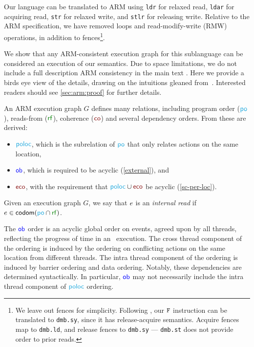 Our language can be translated to ARM using \texttt{ldr} for relaxed read,
\texttt{ldar} for acquiring read, \texttt{str} for relaxed write, and
\texttt{stlr} for releasing write.  Relative to the ARM specification, we
have removed loops and read-modify-write (RMW) operations, in addition to
fences\footnote{We leave out fences for simplicity.  Following
  \citet{DBLP:journals/pacmpl/PodkopaevLV19}, our $\mathtt{F}$ instruction can be
  translated to \texttt{dmb.sy}, since it has release-acquire semantics.
  Acquire fences map to \texttt{dmb.ld}, and release fences to
  \texttt{dmb.sy} --- \texttt{dmb.st} does not provide order to prior
  reads.}.

We show that any ARM-consistent execution graph for this sublanguage can be
considered an execution of our semantics.  
% 
% 
Due to space limitations, we do not include a full description ARM
consistency in the main text .
Here we provide a birds eye view of the details, drawing on the intuitions gleaned from~\citep{DBLP:journals/pacmpl/PulteFDFSS18}.  
Interested readers should see \textsection\ref{sec:arm:proof}
for further details.

An ARM execution graph $G$ defines many relations, including program order
($\rpox$), reads-from ($\rrfx$), coherence ($\rco$) and several dependency
orders.  From these are derived:
\begin{itemize}
\item ${\rpoloc}$, which is the subrelation of $\rpox$ that only relates
  actions on the same location,
\item ${\mathrel{\textcolor{blue}{\mathsf{ob}}}}$, which is required to be acyclic (\ref{external}), and
\item $\reco$, with the requirement that ${\rpoloc}\cup{\reco}$ be acyclic (\ref{sc-per-loc}).
\end{itemize}
Given an execution graph $G$, we say that $e$ is an \emph{internal read} if $\aEv\in\fcodom({\rpox}\cap {\rrfx})$.

The ${\mathrel{\textcolor{blue}{\mathsf{ob}}}}$ order is an acyclic global order on events, agreed upon by all threads, reflecting the progress of time in an \armeight\ execution.  The cross thread component of the ordering is induced by the ordering on conflicting actions on the same location from different threads.    The intra thread component of the ordering is induced by barrier ordering and data ordering.  Notably, these dependencies  are determined syntactically.  In particular, $\mathrel{\textcolor{blue}{\mathsf{ob}}}$
may not necessarily include the intra thread component of $\rpoloc$ ordering.  

